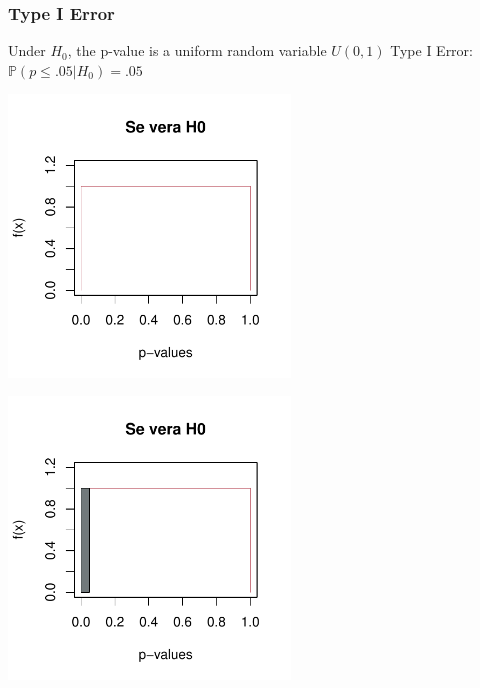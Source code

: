 \documentclass[xcolor={dvipsnames}]{beamer}
\newcommand{\rbf}[1]{\textcolor{redUnipd}{ #1}}
\begin{document}
\begin{frame}
\frametitle{Type I Error}

\begin{overprint}
 {Under $H_0$, the p-value is a \rbf{uniform random variable} $U(0,1)$}
 {\rbf{Type I Error}: $\mathbb{P}(p\leq .05 |H_0)=.05$} %
\end{overprint} 
\begin{overprint} 
 \centerline{\includegraphics[width=7.5cm]{plaatjes/uniform1}}
 \centerline{\includegraphics[width=7.5cm]{plaatjes/uniform2}}
\end{overprint} 
\end{frame}
\end{document}
